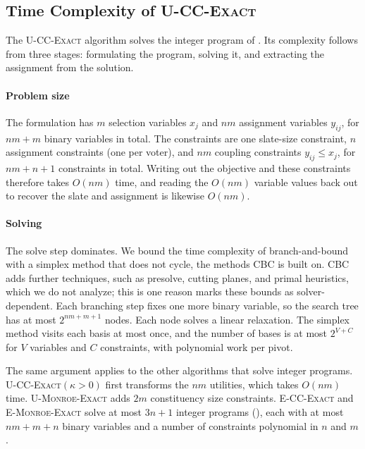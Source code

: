 \documentclass[letterpaper]{article} %
\newcommand{\Exact}{\textsc{U-CC-Exact}}
\newcommand{\ExactP}{\textsc{U-CC-Exact}$(\kappa>0)$}
\newcommand{\ExactMonroe}{\textsc{U-Monroe-Exact}}
\newcommand{\EExactMonroe}{\textsc{E-Monroe-Exact}}
\newcommand{\ECCExact}{\textsc{E-CC-Exact}}
\begin{document}
\subsection{Time Complexity of \Exact{}} \label{app:brute-force-vs-exact}
The \Exact{} algorithm solves the integer program of .
Its complexity follows from three stages: formulating the program, solving it, and extracting the assignment from the solution.

\paragraph{Problem size} The formulation has $m$ selection variables $x_j$ and $nm$ assignment variables $y_{ij}$, for $nm+m$ binary variables in total.
The constraints are one slate-size constraint, $n$ assignment constraints (one per voter), and $nm$ coupling constraints $y_{ij}\le x_j$, for $nm+n+1$ constraints in total.
Writing out the objective and these constraints therefore takes $O(nm)$ time, and reading the $O(nm)$ variable values back out to recover the slate and assignment is likewise $O(nm)$.

\paragraph{Solving} The solve step dominates.
We bound the time complexity of branch-and-bound with a simplex method that does not cycle, the methods CBC is built on.
CBC adds further techniques, such as presolve, cutting planes, and primal heuristics, which we do not analyze; this is one reason  marks these bounds as solver-dependent.
Each branching step fixes one more binary variable, so the search tree has at most \(2^{nm+m+1}\) nodes.
Each node solves a linear relaxation.
The simplex method visits each basis at most once, and the number of bases is at most \(2^{V+C}\) for \(V\) variables and \(C\) constraints, with polynomial work per pivot.

The same argument applies to the other algorithms that solve integer programs.
\ExactP{} first transforms the \(nm\) utilities, which takes \(O(nm)\) time.
\ExactMonroe{} adds \(2m\) constituency size constraints.
\ECCExact{} and \EExactMonroe{} solve at most \(3n+1\) integer programs (), each with at most \(nm+m+n\) binary variables and a number of constraints polynomial in \(n\) and \(m\).
\end{document}
